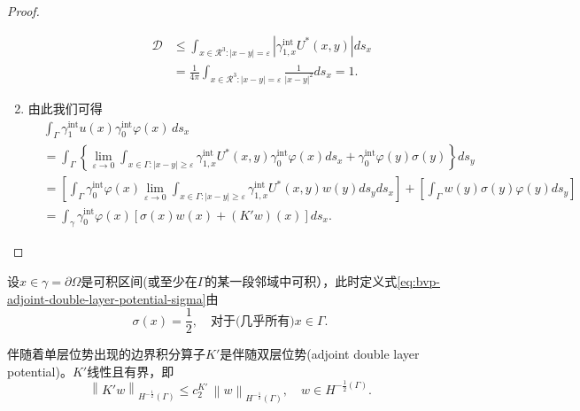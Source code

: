 \begin{proof}
\begin{enumerate}
\begin{enumerate}
\begin{enumerate}
\begin{equation*}
\begin{split}
      \mathcal{D} &\le
      \int_{x \in \mathcal{R}^3:\left| x - y \right| = \varepsilon}
      \left|
      \gamma_{1,x}^{\text{int}} U^{*}(x,y)
      \right|
      d s_x \\
      & = \frac{1}{4\pi}
      \int_{x \in \mathcal{R}^3:\left| x - y \right| = \varepsilon}
      \frac{1}{\left| x - y \right|^2}
      d s_x = 1.
    \end{split}
  \end{equation*}
\end{enumerate}
\end{enumerate}
\item 由此我们可得
\begin{equation*}
  \begin{split}
    &\int_{\Gamma} \gamma_{1}^{\text{int}} u(x) \gamma_{0}^{\text{int}} \varphi(x) \, d s_x \\
    & = \int_{\Gamma}
    \left\{
    \lim_{\varepsilon \rightarrow 0}
    \int_{x \in \Gamma: \left| x - y \right| \ge \varepsilon}
    \gamma_{1,x}^{\text{int}}
    U^{*}(x,y)
    \gamma_{0}^{\text{int}}
    \varphi(x)
    d s_x
    + \gamma_{0}^{\text{int}}
    \varphi(y)
    \sigma(y)
    \right\}
    d s_y \\
    & =
    \left[
    \int_{\Gamma}
    \gamma_{0}^{\text{int}}
    \varphi(x)
    \lim_{\varepsilon \rightarrow 0}
    \int_{x \in \Gamma: \left| x - y \right| \ge \varepsilon}
    \gamma_{1,x}^{\text{int}}
    U^{*}(x,y)
    w(y)
    d s_y d s_x
    \right]
    + \left[
    \int_{\Gamma}
    w(y)
    \sigma(y)
    \varphi(y)
    d s_y
    \right] \\
    &= \int_{\gamma}
    \gamma_{0}^{\text{int}} \varphi(x)
    \left[
    \sigma(x) w(x) + \left( K' w \right)(x)
    \right]
    d s_{x}.
  \end{split}
\end{equation*}
\end{enumerate}
\end{proof}


设$x \in \gamma = \partial \Omega$是可积区间(或至少在$\Gamma$的某一段邻域中可积），此时定义式\eqref{eq:bvp-adjoint-double-layer-potential-sigma}由
\begin{equation*}
  \sigma(x) = \frac{1}{2}, \quad \text{对于(几乎所有)} x \in \Gamma.
\end{equation*}

伴随着单层位势出现的边界积分算子$K'$是伴随双层位势(adjoint double layer potential)。$K'$线性且有界，即
\begin{equation}
  \label{eq:bvp-adjdoubleayer-k-property}
  \left\| K' w \right\|_{H^{-\frac{1}{2}}(\Gamma)}
  \le c_{2}^{K'} \, \left\| w \right\|_{H^{-\frac{1}{2}}(\Gamma)}, \quad w \in H^{-\frac{1}{2}(\Gamma)}.
\end{equation}

